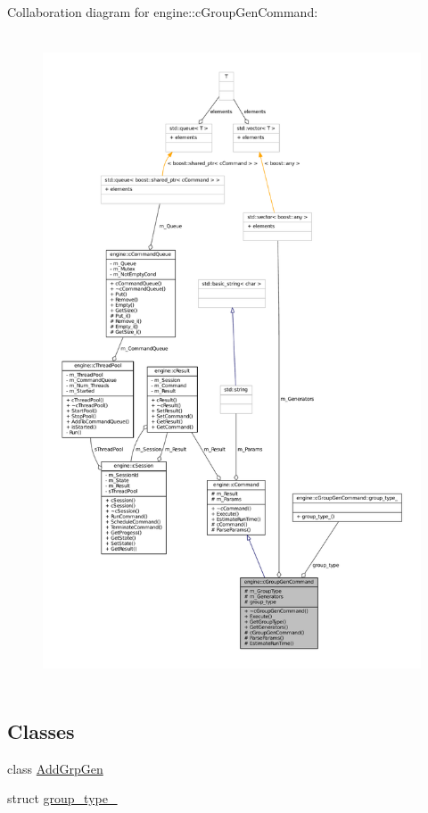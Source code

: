 \-Collaboration diagram for engine\-:\-:c\-Group\-Gen\-Command\-:
\nopagebreak
\begin{figure}[H]
\begin{center}
\leavevmode
\includegraphics[height=550pt]{classengine_1_1cGroupGenCommand__coll__graph}
\end{center}
\end{figure}
\subsection*{\-Classes}
\begin{DoxyCompactItemize}
\item 
class \hyperlink{classengine_1_1cGroupGenCommand_1_1AddGrpGen}{\-Add\-Grp\-Gen}
\item 
struct \hyperlink{structengine_1_1cGroupGenCommand_1_1group__type__}{group\-\_\-type\-\_\-}
\end{DoxyCompactItemize}
